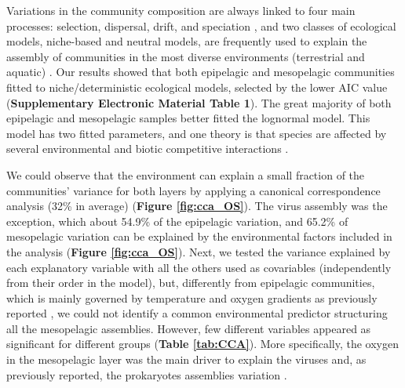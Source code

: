 \documentclass[fleqn,10pt]{wlscirep}
\begin{document}
Variations in the community composition are always linked to four main processes: selection, dispersal, drift, and speciation \cite{vellend_conceptual_2010}, and two classes of ecological models, niche-based and neutral models, are frequently used to explain the assembly of communities in the most diverse environments (terrestrial and aquatic) \cite{chave_neutral_2004, mcgill_empirical_2006}. Our results showed that both epipelagic and mesopelagic communities fitted to niche/deterministic ecological models, selected by the lower AIC value (\textbf{Supplementary Electronic Material Table 1}).  The great majority of both epipelagic and mesopelagic samples better fitted the lognormal model. This model has two fitted parameters, and one theory is that species are affected by several environmental and biotic competitive interactions \cite{wilson_methods_1991}. 

We could observe that the environment can explain a small fraction of the communities’ variance for both layers by applying a canonical correspondence analysis (32\% in average) (\textbf{Figure \ref{fig:cca_OS}}). The virus assembly was the exception, which about 54.9\% of the epipelagic variation, and 65.2\% of mesopelagic variation can be explained by the environmental factors included in the analysis (\textbf{Figure \ref{fig:cca_OS}}). Next, we tested the variance explained by each explanatory variable with all the others used as covariables (independently from their order in the model), but, differently from epipelagic communities, which is mainly governed by temperature and oxygen gradients as previously reported \cite{sunagawa_structure_2015,gregory_marine_2019,ibarbalz_global_2019,giner_marked_2020, ghiglione_pole--pole_2012}, we could not identify a common environmental predictor structuring all the mesopelagic assemblies. However, few different variables appeared as significant for different groups (\textbf{Table \ref{tab:CCA}}). More specifically, the oxygen in the mesopelagic layer was the main driver to explain the viruses and, as previously reported, the prokaryotes assemblies variation \cite{wright_microbial_2012, ulloa_pelagic_2013, aldunate_oxygen_2018}. 
\end{document}

